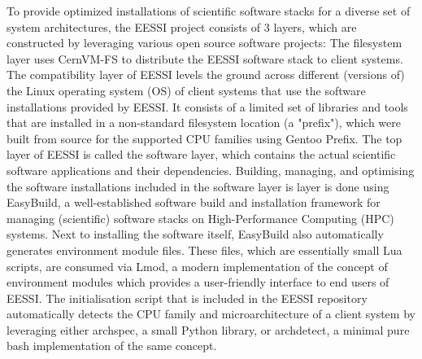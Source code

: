 To provide optimized installations of scientific software stacks for a diverse set of system architectures, the EESSI project consists of 3 layers, which are constructed by leveraging various open source software projects:
The filesystem layer uses CernVM-FS to distribute the EESSI software stack to client systems. The compatibility layer of EESSI levels the ground across different (versions of) the Linux operating system (OS) of client systems that use the software installations provided by EESSI. It consists of a limited set of libraries and tools that are installed in a non-standard filesystem location (a "prefix"), which were built from source for the supported CPU families using Gentoo Prefix. The top layer of EESSI is called the software layer, which contains the actual scientific software applications and their dependencies. Building, managing, and optimising the software installations included in the software layer is layer is done using EasyBuild, a well-established software build and installation framework for managing (scientific) software stacks on High-Performance Computing (HPC) systems. Next to installing the software itself, EasyBuild also automatically generates environment module files. These files, which are essentially small Lua scripts, are consumed via Lmod, a modern implementation of the concept of environment modules which provides a user-friendly interface to end users of EESSI. The initialisation script that is included in the EESSI repository automatically detects the CPU family and microarchitecture of a client system by leveraging either archspec, a small Python library, or archdetect, a minimal pure bash implementation of the same concept.


